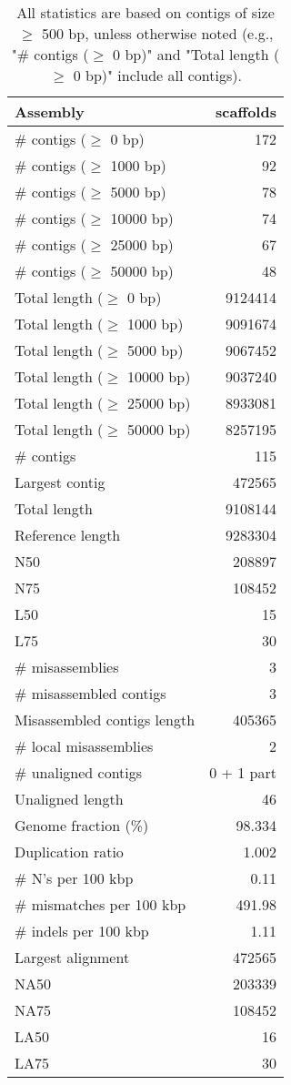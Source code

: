 \documentclass[12pt,a4paper]{article}
\begin{document}
\begin{table}[ht]
\begin{center}
\caption{All statistics are based on contigs of size $\geq$ 500 bp, unless otherwise noted (e.g., "\# contigs ($\geq$ 0 bp)" and "Total length ($\geq$ 0 bp)" include all contigs).}
\begin{tabular}{|l*{1}{|r}|}
\hline
Assembly & scaffolds \\ \hline
\# contigs ($\geq$ 0 bp) & 172 \\ \hline
\# contigs ($\geq$ 1000 bp) & 92 \\ \hline
\# contigs ($\geq$ 5000 bp) & 78 \\ \hline
\# contigs ($\geq$ 10000 bp) & 74 \\ \hline
\# contigs ($\geq$ 25000 bp) & 67 \\ \hline
\# contigs ($\geq$ 50000 bp) & 48 \\ \hline
Total length ($\geq$ 0 bp) & 9124414 \\ \hline
Total length ($\geq$ 1000 bp) & 9091674 \\ \hline
Total length ($\geq$ 5000 bp) & 9067452 \\ \hline
Total length ($\geq$ 10000 bp) & 9037240 \\ \hline
Total length ($\geq$ 25000 bp) & 8933081 \\ \hline
Total length ($\geq$ 50000 bp) & 8257195 \\ \hline
\# contigs & 115 \\ \hline
Largest contig & 472565 \\ \hline
Total length & 9108144 \\ \hline
Reference length & 9283304 \\ \hline
N50 & 208897 \\ \hline
N75 & 108452 \\ \hline
L50 & 15 \\ \hline
L75 & 30 \\ \hline
\# misassemblies & 3 \\ \hline
\# misassembled contigs & 3 \\ \hline
Misassembled contigs length & 405365 \\ \hline
\# local misassemblies & 2 \\ \hline
\# unaligned contigs & 0 + 1 part \\ \hline
Unaligned length & 46 \\ \hline
Genome fraction (\%) & 98.334 \\ \hline
Duplication ratio & 1.002 \\ \hline
\# N's per 100 kbp & 0.11 \\ \hline
\# mismatches per 100 kbp & 491.98 \\ \hline
\# indels per 100 kbp & 1.11 \\ \hline
Largest alignment & 472565 \\ \hline
NA50 & 203339 \\ \hline
NA75 & 108452 \\ \hline
LA50 & 16 \\ \hline
LA75 & 30 \\ \hline
\end{tabular}
\end{center}
\end{table}
\end{document}
